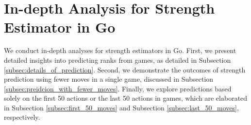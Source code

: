         


\section{In-depth Analysis for Strength Estimator in Go}
\label{sec:further_analysis}

We conduct in-depth analyses for strength estimators in Go. 
First, we present detailed insights into predicting ranks from games, as detailed in Subsection \ref{subsec:details_of_prediction}.
Second, we demonstrate the outcomes of strength prediction using fewer moves in a single game, discussed in Subsection \ref{subsec:preidcion_with_fewer_moves}. 
Finally, we explore predictions based solely on the first 50 actions or the last 50 actions in games, which are elaborated in Subsection \ref{subsec:first_50_moves} and Subsection \ref{subsec:last_50_moves}, respectively.


